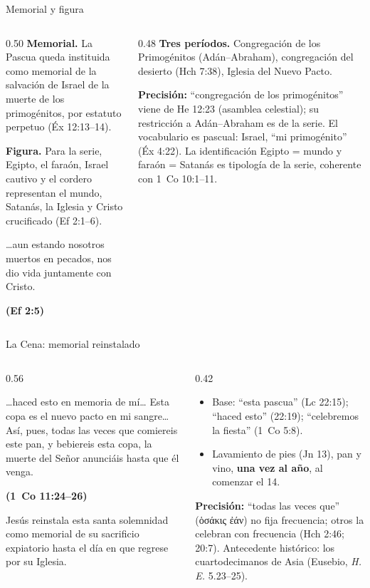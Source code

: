 \documentclass[hyperref={bookmarks=false},aspectratio=169]{beamer}
\newcommand{\grc}[1]{\foreignlanguage{ancientgreek}{#1}}
\newcommand{\fuente}[1]{\par\hfill{\upshape\bfseries\footnotesize\textcolor{tierraroja}{#1}}}
\newcommand{\destacar}[1]{\textbf{\textcolor{tierraroja}{#1}}}
\newcommand{\precision}[1]{{\footnotesize\color{sepia}\textbf{Precisión:} #1}}
\begin{document}
\begin{frame}{Memorial y figura}
\begin{columns}[t,onlytextwidth]
\begin{column}{0.50\textwidth}\small\RaggedRight
\textbf{\textcolor{tierraroja}{Memorial.}} La Pascua queda instituida como memorial de la salvación de Israel de la muerte de los primogénitos, por estatuto perpetuo (Éx 12:13--14).\par\smallskip
\textbf{\textcolor{tierraroja}{Figura.}} Para la serie, Egipto, el faraón, Israel cautivo y el cordero representan el mundo, Satanás, la Iglesia y Cristo crucificado (Ef 2:1--6).
\begin{cita}\ldots{}aun estando nosotros muertos en pecados, nos dio vida juntamente con Cristo.\fuente{(Ef 2:5)}\end{cita}
\end{column}
\begin{column}{0.48\textwidth}\small\RaggedRight
\textbf{\textcolor{tierraroja}{Tres períodos.}} Congregación de los Primogénitos (Adán--Abraham), congregación del desierto (Hch 7:38), Iglesia del Nuevo Pacto.\par\smallskip
\precision{``congregación de los primogénitos'' viene de He 12:23 (asamblea celestial); su restricción a Adán--Abraham es de la serie. El vocabulario es pascual: Israel, ``mi primogénito'' (Éx 4:22). La identificación Egipto = mundo y faraón = Satanás es tipología de la serie, coherente con 1~Co 10:1--11.}
\end{column}
\end{columns}
\end{frame}

\begin{frame}{La Cena: memorial reinstalado}
\begin{columns}[c,onlytextwidth]
\begin{column}{0.56\textwidth}
\begin{cita}\ldots{}haced esto en memoria de mí\ldots{} Esta copa es el nuevo pacto en mi sangre\ldots{} Así, pues, todas las veces que comiereis este pan, y bebiereis esta copa, la muerte del Señor anunciáis hasta que él venga.\fuente{(1~Co 11:24--26)}\end{cita}
\scriptsize\RaggedRight Jesús reinstala esta santa solemnidad como memorial de su sacrificio expiatorio hasta el día en que regrese por su Iglesia.
\end{column}
\begin{column}{0.42\textwidth}\scriptsize
\begin{itemize}\scriptsize
\item Base: ``esta pascua'' (Lc 22:15); ``haced esto'' (22:19); ``celebremos la fiesta'' (1~Co 5:8).
\item Lavamiento de pies (Jn 13), pan y vino, \destacar{una vez al año}, al comenzar el 14.
\end{itemize}
\precision{``todas las veces que'' (\grc{ὁσάκις ἐάν}) no fija frecuencia; otros la celebran con frecuencia (Hch 2:46; 20:7). Antecedente histórico: los cuartodecimanos de Asia (Eusebio, \emph{H.\,E.} 5.23--25).}
\end{column}
\end{columns}
\end{frame}
\end{document}
